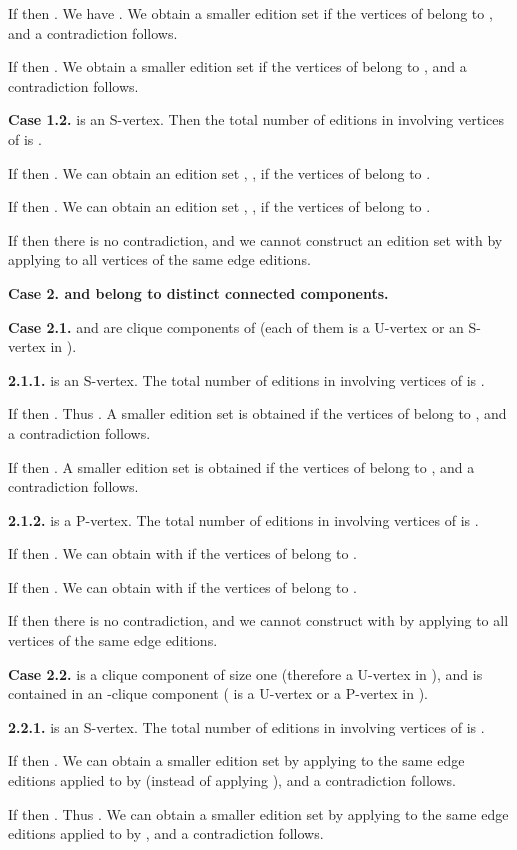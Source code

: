 \documentclass[12pt]{article}
\begin{document}
 If  then . We have . We obtain a smaller edition set if the vertices of
 belong to , and a contradiction follows.

 If  then
. We obtain a smaller edition set if the vertices of  belong to , and a
contradiction follows.

\textbf{Case 1.2.}  is an S-vertex. Then the total number of
editions in  involving vertices of  is .

 If  then
. We can obtain an edition set ,
, if the vertices of  belong to .

 If  then
. We can obtain an edition set ,
, if the vertices of  belong to .

 If  then there is no contradiction,
and we cannot construct an edition set  with  by applying to all vertices
of  the same edge editions.


\textbf{Case 2.  and  belong to distinct connected
components.}

\textbf{Case 2.1.}  and  are clique components of  (each of them is a U-vertex or an S-vertex in ).

\textbf{2.1.1.}  is an S-vertex. The total number of editions in
 involving vertices of  is .

 If  then . Thus .  A smaller edition set is obtained if the vertices of
 belong to , and a contradiction follows.

 If  then
. A smaller edition set is obtained if the vertices of  belong to , and a
contradiction follows.

\textbf{2.1.2.}  is a P-vertex. The total number of editions in
 involving vertices of  is
.

 If  then
. We can obtain  with  if the vertices of  belong to .

 If  then
. We can obtain  with  if the vertices of  belong to .

 If  then there is no contradiction, and we cannot construct 
with  by applying to all vertices of  the
same edge editions.

\textbf{Case 2.2.}  is a clique component of size one
(therefore a U-vertex in ), and  is contained
in an -clique component ( is a U-vertex or a P-vertex in
).

\textbf{2.2.1.}  is an S-vertex. The total number of editions
in  involving vertices of  is .

 If  then . We can
obtain a smaller edition set by applying to  the same edge
editions applied to  by  (instead of applying ), and
a contradiction follows.

 If   then . Thus . We can obtain a smaller edition set by
applying to  the same edge editions applied to  by ,
and a contradiction follows.
\end{document}
